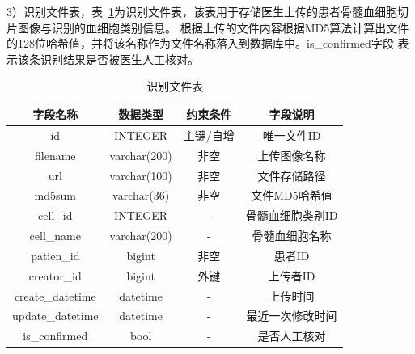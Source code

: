 3）识别文件表，表~\ref{table:recog_table}为识别文件表，该表用于存储医生上传的患者骨髓血细胞切片图像与识别的血细胞类别信息。
根据上传的文件内容根据MD5算法计算出文件的128位哈希值，并将该名称作为文件名称落入到数据库中。is\_confirmed字段
表示该条识别结果是否被医生人工核对。
\begin{table}[htbp]
    \caption{识别文件表}   
    \centering 
    \label{table:recog_table}
    \begin{tabular*}{0.9\hsize}{@{}@{\extracolsep{\fill}}cccc@{}}
      \toprule[1pt]
      字段名称  &  数据类型 & 约束条件 & 字段说明 \\
      \midrule[1pt] 
      id           & INTEGER      & 主键/自增    & 唯一文件ID   \\ 
      filename     & varchar(200) & 非空         & 上传图像名称   \\ 
      url          & varchar(100) & 非空         & 文件存储路径   \\ 
      md5sum       & varchar(36)  & 非空         & 文件MD5哈希值 \\
      cell\_id      & INTEGER      & -            & 骨髓血细胞类别ID  \\
      cell\_name    & varchar(200) & -            & 骨髓血细胞名称  \\
      patien\_id   & bigint       & 非空         & 患者ID  \\ 
      creator\_id  & bigint       & 外键         & 上传者ID  \\ 
      create\_datetime & datetime & -    & 上传时间 \\
      update\_datetime & datetime & -    & 最近一次修改时间 \\
      is\_confirmed    & bool     & -    & 是否人工核对 \\
      \bottomrule[1pt]      
    \end{tabular*} 
\end{table}
